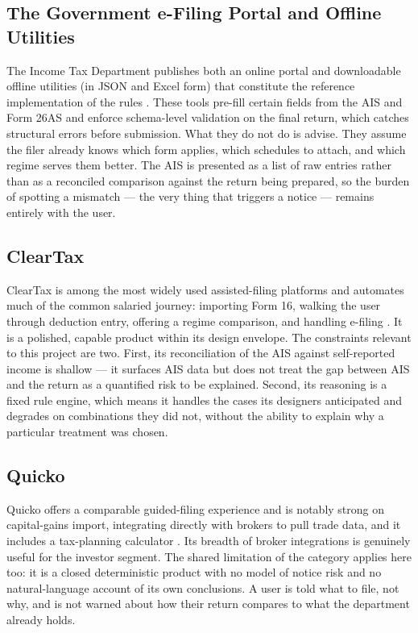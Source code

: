 \subsection{The Government e-Filing Portal and Offline Utilities}
The Income Tax Department publishes both an online portal and downloadable
offline utilities (in JSON and Excel form) that constitute the reference
implementation of the rules \cite{ref1}. These tools pre-fill certain fields
from the AIS and Form 26AS and enforce schema-level validation on the final
return, which catches structural errors before submission. What they do not do
is advise. They assume the filer already knows which form applies, which
schedules to attach, and which regime serves them better. The AIS is presented
as a list of raw entries rather than as a reconciled comparison against the
return being prepared, so the burden of spotting a mismatch --- the very thing
that triggers a notice --- remains entirely with the user.

\subsection{ClearTax}
ClearTax is among the most widely used assisted-filing platforms and automates
much of the common salaried journey: importing Form 16, walking the user through
deduction entry, offering a regime comparison, and handling e-filing
\cite{ref2}. It is a polished, capable product within its design envelope. The
constraints relevant to this project are two. First, its reconciliation of the
AIS against self-reported income is shallow --- it surfaces AIS data but does
not treat the gap between AIS and the return as a quantified risk to be
explained. Second, its reasoning is a fixed rule engine, which means it handles
the cases its designers anticipated and degrades on combinations they did not,
without the ability to explain why a particular treatment was chosen.

\subsection{Quicko}
Quicko offers a comparable guided-filing experience and is notably strong on
capital-gains import, integrating directly with brokers to pull trade data, and
it includes a tax-planning calculator \cite{ref3}. Its breadth of broker
integrations is genuinely useful for the investor segment. The shared limitation
of the category applies here too: it is a closed deterministic product with no
model of notice risk and no natural-language account of its own conclusions. A
user is told what to file, not why, and is not warned about how their return
compares to what the department already holds.

